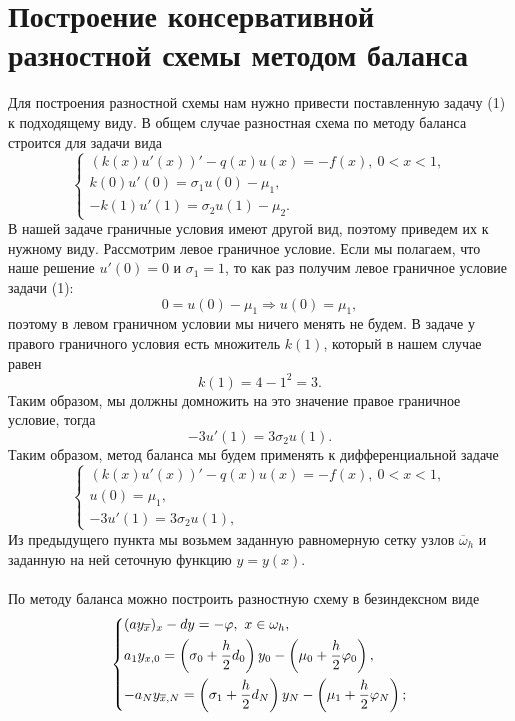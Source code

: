 \documentclass[a4paper, 12pt]{article}
\begin{document}
    \section{Построение консервативной разностной схемы методом баланса}
    Для построения разностной схемы нам нужно привести поставленную задачу (1) к подходящему виду. В общем случае разностная схема по методу баланса строится для задачи вида 
    $$
    \begin{cases}
    	(k(x) u'(x))' - q(x)u(x) = -f(x), \ 0<x<1,\\
    	k(0) u'(0) = \sigma_1 u(0) - \mu_1,\\
    	- k(1) u'(1) = \sigma_2 u(1) - \mu_2.
    \end{cases}
    $$
    В нашей задаче граничные условия имеют другой вид, поэтому приведем их к нужному виду. Рассмотрим левое граничное условие. Если мы полагаем, что наше решение $u'(0) = 0$ и $\sigma_1 = 1$, то как раз получим левое граничное условие задачи (1):
    $$0 = u(0) - \mu_1 \Rightarrow u(0) = \mu_1,$$
    поэтому в левом граничном условии мы ничего менять не будем. В задаче у правого граничного условия есть множитель $k(1)$, который в нашем случае равен 
    $$k(1) = 4 - 1^2 = 3.$$
    Таким образом, мы должны домножить на это значение правое граничное условие, тогда
    $$-3 u'(1) = 3 \sigma_2 u(1).$$
    Таким образом, метод баланса мы будем применять к дифференциальной задаче
    \begin{equation}
    	\begin{cases}
    		(k(x)u'(x))' - q(x)u(x) = -f(x),\ 0 < x<1,\\
    		u(0) = \mu_1,\\
    		-3u'(1) = 3\sigma_2 u(1),
    	\end{cases}
    \end{equation}
    Из предыдущего пункта мы возьмем заданную равномерную сетку узлов $\overline \omega_h$ и заданную на ней сеточную функцию $y = y(x)$.
    \\\\
    По методу баланса можно построить разностную схему в безиндексном виде
    \begin{equation}
    	\begin{dcases}
    		(a y_{\overline x})_x - dy = -\varphi,\ x \in \omega_h, \\
    		a_1 y_{x,0} = \left(\sigma_0 + \dfrac h2 d_0\right)y_0 - \left(\mu_0 + \dfrac h2 \varphi_0\right),\\
    		-a_N y_{\overline x, N} = \left(\sigma_1 + \dfrac h2 d_N\right)y_N - \left(\mu_1 + \dfrac h2 \varphi_N\right);
    	\end{dcases}
    \end{equation}
\end{document}
